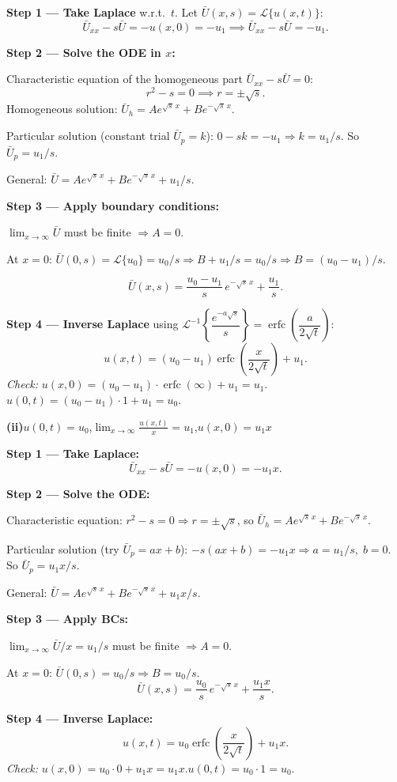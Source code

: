 \documentclass[12pt]{article}
\newcommand{\Lt}{\mathcal{L}}
\begin{document}
\begin{ansbox}
\textbf{Step 1 — Take Laplace} w.r.t.\ $t$. Let $\bar{U}(x,s)=\Lt\{u(x,t)\}$:
\[
  \bar{U}_{xx}-s\bar{U}=-u(x,0)=-u_1 \implies \bar{U}_{xx}-s\bar{U}=-u_1.
\]

\textbf{Step 2 — Solve the ODE in $x$:}

Characteristic equation of the homogeneous part $\bar{U}_{xx}-s\bar{U}=0$:
\[
  r^2-s=0 \implies r=\pm\sqrt{s}.
\]
Homogeneous solution: $\bar{U}_h=Ae^{\sqrt{s}\,x}+Be^{-\sqrt{s}\,x}$.

Particular solution (constant trial $\bar{U}_p=k$): $0-sk=-u_1 \Rightarrow k=u_1/s$. So $\bar{U}_p=u_1/s$.

General: $\bar{U}=Ae^{\sqrt{s}\,x}+Be^{-\sqrt{s}\,x}+u_1/s$.

\textbf{Step 3 — Apply boundary conditions:}

$\lim_{x\to\infty}\bar{U}$ must be finite $\Rightarrow A=0$.

At $x=0$: $\bar{U}(0,s)=\Lt\{u_0\}=u_0/s \Rightarrow B+u_1/s=u_0/s \Rightarrow B=(u_0-u_1)/s$.

\[
  \bar{U}(x,s)=\frac{u_0-u_1}{s}\,e^{-\sqrt{s}\,x}+\frac{u_1}{s}.
\]

\textbf{Step 4 — Inverse Laplace} using $\Lt^{-1}\!\left\{\dfrac{e^{-a\sqrt{s}}}{s}\right\}=\operatorname{erfc}\!\left(\dfrac{a}{2\sqrt{t}}\right)$:
\[
  \boxed{u(x,t)=(u_0-u_1)\operatorname{erfc}\!\left(\frac{x}{2\sqrt{t}}\right)+u_1.}
\]
\textit{Check:} $u(x,0)=(u_0-u_1)\cdot\operatorname{erfc}(\infty)+u_1=u_1$.\;\checkmark\quad $u(0,t)=(u_0-u_1)\cdot1+u_1=u_0$.\;\checkmark
\end{ansbox}

\medskip\textbf{(ii)}\quad $u(0,t)=u_0$,\quad $\displaystyle\lim_{x\to\infty}\frac{u(x,t)}{x}=u_1$,\quad $u(x,0)=u_1 x$

\begin{ansbox}
\textbf{Step 1 — Take Laplace:}
\[
  \bar{U}_{xx}-s\bar{U}=-u(x,0)=-u_1 x.
\]

\textbf{Step 2 — Solve the ODE:}

Characteristic equation: $r^2-s=0\Rightarrow r=\pm\sqrt{s}$, so $\bar{U}_h=Ae^{\sqrt{s}\,x}+Be^{-\sqrt{s}\,x}$.

Particular solution (try $\bar{U}_p=ax+b$):
$-s(ax+b)=-u_1 x \Rightarrow a=u_1/s,\;b=0$. So $\bar{U}_p=u_1 x/s$.

General: $\bar{U}=Ae^{\sqrt{s}\,x}+Be^{-\sqrt{s}\,x}+u_1 x/s$.

\textbf{Step 3 — Apply BCs:}

$\lim_{x\to\infty}\bar{U}/x=u_1/s$ must be finite $\Rightarrow A=0$.

At $x=0$: $\bar{U}(0,s)=u_0/s \Rightarrow B=u_0/s$.
\[
  \bar{U}(x,s)=\frac{u_0}{s}\,e^{-\sqrt{s}\,x}+\frac{u_1 x}{s}.
\]

\textbf{Step 4 — Inverse Laplace:}
\[
  \boxed{u(x,t)=u_0\operatorname{erfc}\!\left(\frac{x}{2\sqrt{t}}\right)+u_1 x.}
\]
\textit{Check:} $u(x,0)=u_0\cdot0+u_1 x=u_1 x$.\;\checkmark\quad $u(0,t)=u_0\cdot1=u_0$.\;\checkmark
\end{ansbox}
\end{document}
